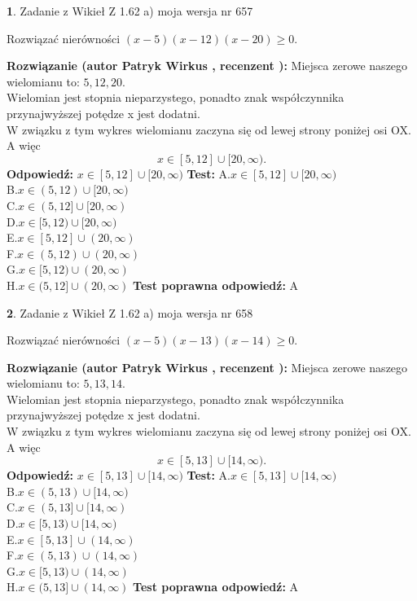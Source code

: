 \documentclass[12pt, a4paper]{article}
\theoremstyle{definition} %
\newtheorem{zad}{}
\newcommand{\zadStart}[1]{\begin{zad}#1\newline}
\newcommand{\zadStop}{\end{zad}}
\newcommand{\rozwStart}[2]{\noindent \textbf{Rozwiązanie (autor #1 , recenzent #2): }\newline}
\newcommand{\rozwStop}{\newline}
\newcommand{\odpStart}{\noindent \textbf{Odpowiedź:}\newline}
\newcommand{\odpStop}{\newline}
\newcommand{\testStart}{\noindent \textbf{Test:}\newline}
\newcommand{\testStop}{\newline}
\newcommand{\kluczStart}{\noindent \textbf{Test poprawna odpowiedź:}\newline}
\newcommand{\kluczStop}{\newline}
\begin{document}
\zadStart{Zadanie z Wikieł Z 1.62 a) moja wersja nr 657}

Rozwiązać nierówności $(x-5)(x-12)(x-20)\ge0$.
\zadStop
\rozwStart{Patryk Wirkus}{}
Miejsca zerowe naszego wielomianu to: $5, 12, 20$.\\
Wielomian jest stopnia nieparzystego, ponadto znak współczynnika przy\linebreak najwyższej potędze x jest dodatni.\\ W związku z tym wykres wielomianu zaczyna się od lewej strony poniżej osi OX. A więc $$x \in [5,12] \cup [20,\infty).$$
\rozwStop
\odpStart
$x \in [5,12] \cup [20,\infty)$
\odpStop
\testStart
A.$x \in [5,12] \cup [20,\infty)$\\
B.$x \in (5,12) \cup [20,\infty)$\\
C.$x \in (5,12] \cup [20,\infty)$\\
D.$x \in [5,12) \cup [20,\infty)$\\
E.$x \in [5,12] \cup (20,\infty)$\\
F.$x \in (5,12) \cup (20,\infty)$\\
G.$x \in [5,12) \cup (20,\infty)$\\
H.$x \in (5,12] \cup (20,\infty)$
\testStop
\kluczStart
A
\kluczStop



\zadStart{Zadanie z Wikieł Z 1.62 a) moja wersja nr 658}

Rozwiązać nierówności $(x-5)(x-13)(x-14)\ge0$.
\zadStop
\rozwStart{Patryk Wirkus}{}
Miejsca zerowe naszego wielomianu to: $5, 13, 14$.\\
Wielomian jest stopnia nieparzystego, ponadto znak współczynnika przy\linebreak najwyższej potędze x jest dodatni.\\ W związku z tym wykres wielomianu zaczyna się od lewej strony poniżej osi OX. A więc $$x \in [5,13] \cup [14,\infty).$$
\rozwStop
\odpStart
$x \in [5,13] \cup [14,\infty)$
\odpStop
\testStart
A.$x \in [5,13] \cup [14,\infty)$\\
B.$x \in (5,13) \cup [14,\infty)$\\
C.$x \in (5,13] \cup [14,\infty)$\\
D.$x \in [5,13) \cup [14,\infty)$\\
E.$x \in [5,13] \cup (14,\infty)$\\
F.$x \in (5,13) \cup (14,\infty)$\\
G.$x \in [5,13) \cup (14,\infty)$\\
H.$x \in (5,13] \cup (14,\infty)$
\testStop
\kluczStart
A
\kluczStop
\end{document}

